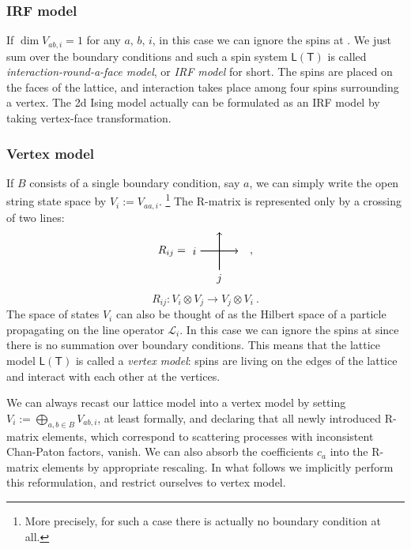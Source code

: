 \subsubsection*{IRF model}

If $\dim V_{ab,i}=1$ for any $a,\,b,\,i$, in this case we can ignore
the spins at . We just sum over the boundary conditions
and such a spin system $\mathsf{L}(\mathsf{T})$ is called
\emph{interaction-round-a-face model}, or \emph{IRF model} for short.
The spins are placed on the faces of the lattice, and interaction
takes place among four spins surrounding a vertex. The 2d Ising model
actually can be formulated as an IRF model by taking vertex-face transformation.


\subsubsection*{Vertex model}

If $B$ consists of a single boundary condition, say $a$, we can
simply write the open string state space by $V_{i}:=V_{aa,i}$.%
%
\footnote{More precisely, for such a case there is actually no boundary condition at all.}
%
The R-matrix is represented only by a crossing of two lines:
\begin{equation}
  R_{ij}
  =
    \begin{tikzpicture}[scale=0.6, baseline=(x.base)]
        \node (x) at (0,0) {\vphantom{x}};

        \draw[thick, ->] (0,0) node[left] {$i$} -- (2,0);
        \draw[thick, ->] (1,-1) node[below] {$j$} -- (1,1);

    \end{tikzpicture}
  \quad ,
\end{equation}
\begin{equation}
  R_{ij}  :  V_{i}\otimes V_{j}  \longrightarrow  V_{j}\otimes V_{i}
  ~ .
\end{equation}
The space of states $V_{i}$ can also be thought of as the Hilbert
space of a particle propagating on the line operator $\mathcal{L}_{i}$.
In this case we can ignore the spins at  since there
is no summation over boundary conditions. This means that the lattice
model $\mathsf{L}(\mathsf{T})$ is called a \emph{vertex
model}: spins are living on the edges of the lattice and interact
with each other at the vertices.

We can always recast our lattice model into a vertex model by setting
$V_{i}:=\bigoplus_{a,b\in B}V_{ab,i}$, at least formally, and declaring
that all newly introduced R-matrix elements, which correspond to scattering
processes with inconsistent Chan-Paton factors, vanish. We can also
absorb the coefficients $c_{a}$ into the R-matrix elements by appropriate
rescaling. In what follows we implicitly perform this reformulation,
and restrict ourselves to vertex model.

